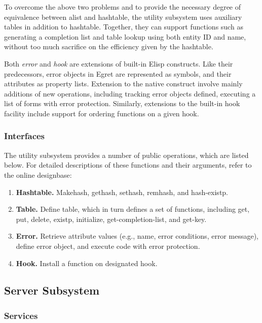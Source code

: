 To overcome the above two problems and to provide the necessary degree of
equivalence between alist and hashtable, the utility subsystem uses
auxiliary tables in addition to hashtable. Together, they can support
functions such as generating a completion list and table lookup using both
entity ID and name, without too much sacrifice on the efficiency given by
the hashtable.

Both {\it error \/} and {\it hook \/} are extensions of built-in Elisp
constructs. Like their predecessors, error objects in Egret are represented
as symbols, and their attributes as property lists. Extension to the native
construct involve mainly additions of new operations, including tracking
error objects defined, executing a list of forms with error protection.
Similarly, extensions to the built-in hook facility include support for
ordering functions on a given hook.


\subsubsection{Interfaces}
The utility subsystem provides a number of public operations, which are
listed below. For detailed descriptions of these functions and their
arguments, refer to the online designbase:

\begin{enumerate}
\item {\bf Hashtable.} Makehash, gethash, sethash, remhash, and
  hash-existp.
  
\item {\bf Table.} Define table, which in turn defines a set of
  functions, including get, put, delete, existp, initialize,
  get-completion-list, and get-key.
  
\item {\bf Error.} Retrieve attribute values (e.g., name, error
  conditions, error message), define error object, and execute code with
  error protection.

\item {\bf Hook.} Install a function on designated hook.
\end{enumerate}



\subsection{Server Subsystem}

\subsubsection{Services}

